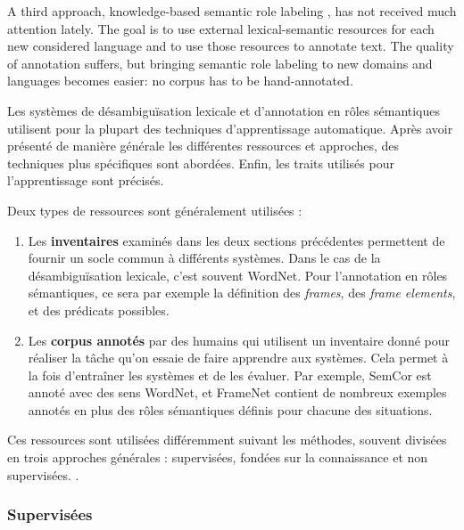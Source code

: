 A third approach, knowledge-based semantic role labeling
\citep{swier2004unsupervised,swier2005exploiting}, has not received much
attention lately. The goal is to use external lexical-semantic resources for
each new considered language and to use those resources to annotate text. The
quality of annotation suffers, but bringing semantic role labeling to new
domains and languages becomes easier: no corpus has to be hand-annotated.

Les systèmes de désambiguïsation lexicale et d'annotation en rôles sémantiques
utilisent pour la plupart des techniques d'apprentissage automatique. Après
avoir présenté de manière générale les différentes ressources et approches, des
techniques plus spécifiques sont abordées. Enfin, les traits utilisés pour
l'apprentissage sont précisés.

Deux types de ressources sont généralement utilisées :

\begin{enumerate}

    \item Les \textbf{inventaires} examinés dans les deux sections précédentes
        permettent de fournir un socle commun à différents systèmes. Dans le
        cas de la désambiguïsation lexicale, c'est souvent WordNet. Pour
        l'annotation en rôles sémantiques, ce sera par exemple la définition
        des \textit{frames}, des \textit{frame elements}, et des prédicats
        possibles.

    \item Les \textbf{corpus annotés} par des humains qui utilisent un
        inventaire donné pour réaliser la tâche qu'on essaie de faire apprendre
        aux systèmes. Cela permet à la fois d'entraîner les systèmes et de les
        évaluer. Par exemple, SemCor est annoté avec des sens WordNet, et
        FrameNet contient de nombreux exemples annotés en plus des rôles
        sémantiques définis pour chacune des situations.

\end{enumerate}

Ces ressources sont utilisées différemment suivant les méthodes, souvent
divisées en trois approches générales : supervisées, fondées sur la
connaissance et non supervisées. \citep{navigli2009word}.

\subsubsection{Supervisées}

